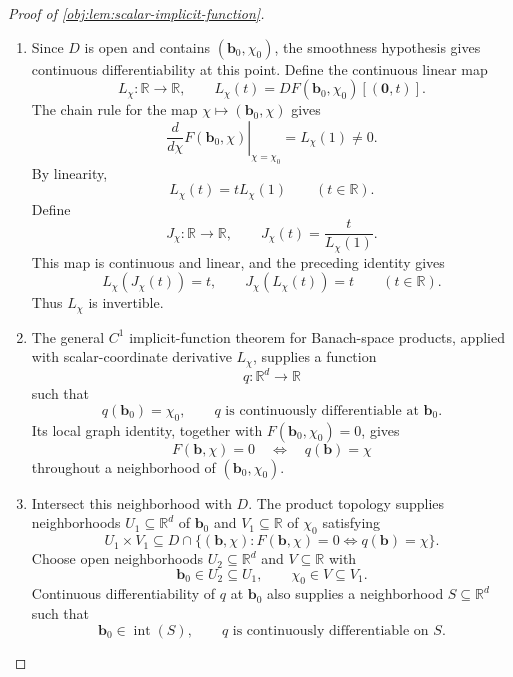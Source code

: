 \begin{proof}[Proof of \cref{obj:lem:scalar-implicit-function}]
\begin{enumerate}
\item Since \(D\) is open and contains \((\mathbf b_0,\chi_0)\), the smoothness hypothesis gives continuous differentiability at this point. Define the continuous linear map
\[
L_\chi:\mathbb R\to\mathbb R,
\qquad
L_\chi(t)=DF(\mathbf b_0,\chi_0)[(\mathbf 0,t)].
\]
The chain rule for the map \(\chi\mapsto(\mathbf b_0,\chi)\) gives
\[
\left.\frac{d}{d\chi}F(\mathbf b_0,\chi)\right|_{\chi=\chi_0}
=L_\chi(1)\ne0.
\]
By linearity,
\[
L_\chi(t)=tL_\chi(1)
\qquad(t\in\mathbb R).
\]
Define
\[
J_\chi:\mathbb R\to\mathbb R,
\qquad
J_\chi(t)=\frac{t}{L_\chi(1)}.
\]
This map is continuous and linear, and the preceding identity gives
\[
L_\chi(J_\chi(t))=t,
\qquad
J_\chi(L_\chi(t))=t
\qquad(t\in\mathbb R).
\]
Thus \(L_\chi\) is invertible. %

\item The general \(C^1\) implicit-function theorem for Banach-space products, applied with scalar-coordinate derivative \(L_\chi\), supplies a function
\[
q:\mathbb R^d\to\mathbb R
\]
such that
\[
q(\mathbf b_0)=\chi_0,
\qquad
q\text{ is continuously differentiable at }\mathbf b_0.
\]
Its local graph identity, together with \(F(\mathbf b_0,\chi_0)=0\), gives
\[
F(\mathbf b,\chi)=0
\quad\Longleftrightarrow\quad
q(\mathbf b)=\chi
\]
throughout a neighborhood of \((\mathbf b_0,\chi_0)\). %

\item Intersect this neighborhood with \(D\). The product topology supplies neighborhoods \(U_1\subseteq\mathbb R^d\) of \(\mathbf b_0\) and \(V_1\subseteq\mathbb R\) of \(\chi_0\) satisfying
\[
U_1\times V_1
\subseteq
D\cap
\bigl\{(\mathbf b,\chi):
F(\mathbf b,\chi)=0
\Longleftrightarrow q(\mathbf b)=\chi\bigr\}.
\]
Choose open neighborhoods \(U_2\subseteq\mathbb R^d\) and \(V\subseteq\mathbb R\) with
\[
\mathbf b_0\in U_2\subseteq U_1,
\qquad
\chi_0\in V\subseteq V_1.
\]
Continuous differentiability of \(q\) at \(\mathbf b_0\) also supplies a neighborhood \(S\subseteq\mathbb R^d\) such that
\[
\mathbf b_0\in\operatorname{int}(S),
\qquad
q\text{ is continuously differentiable on }S.
\]


\end{enumerate}
\end{proof}
